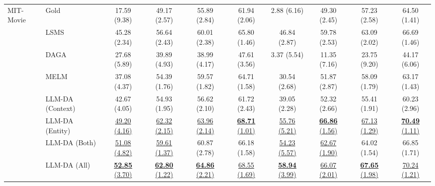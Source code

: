 \documentclass[11pt]{article}
\begin{document}
\begin{table}[!t]
{\begin{tabular}{l|l|cccc|cccc}
        \multirow{9}{*}{{MIT-Movie}} & Gold & 17.59 (9.38) & 49.17 (2.57) & 55.89 (2.84) & 61.94 (2.06) & 2.88 (6.16) & 49.30 (2.45) & 57.23 (2.58) & 64.50 (1.41) \\
        ~ & LSMS & 45.28 (2.34) & 56.64 (2.43) & 60.01 (2.38) & 65.80 (1.46) & 46.84 (2.87) & 59.78 (2.53) & 63.09 (2.02) & 66.69 (1.46) \\
        ~ & DAGA & 27.68 (5.89) & 39.89 (4.93) & 38.99 (4.17) & 47.61 (3.56) & 3.37 (5.54) & 11.35 (7.16) & 23.75 (9.20) & 44.17 (6.06) \\ 
        ~ & MELM & 37.08 (4.37) & 54.39 (1.76) & 59.57 (1.82) & 64.71 (1.58) & 30.54 (2.68) & 51.87 (2.87) & 58.09 (1.79) & 63.17 (1.43) \\
        \rowcolor{gray!10} \cellcolor{gray!0}MIT-Movie & LLM-DA (Context) & {42.67 (4.05)} & 54.93 (1.95) & 56.62 (2.10) & 61.72 (2.43) & {39.05 (2.28)} & 52.32 (2.66) & {55.41 (1.91)} & {60.23 (2.96)} \\ 
        \rowcolor{gray!10} \cellcolor{gray!0}~ & LLM-DA (Entity) & \underline{49.20 (4.16)} & \underline{62.32 (2.15)} & \underline{63.96 (2.14)} & \underline{\textbf{68.71} (1.01)} & \underline{55.76 (5.21)} & \underline{\textbf{66.86} (1.56)} & \underline{67.13 (1.29)} & \underline{\textbf{70.49} (1.11)} \\ 
        \rowcolor{gray!10} \cellcolor{gray!0}~ & LLM-DA (Both) & \underline{51.08 (4.82)} & \underline{59.61 (1.37)} & 60.87 (2.78) & 66.18 (1.58) & \underline{54.23 (5.57)} & \underline{62.67 (1.90)} & 64.02 (1.54) & 66.85 (1.71) \\ 
        \rowcolor{gray!10} \cellcolor{gray!0}~ & LLM-DA (All) & \underline{\textbf{52.85} (3.70)} & \underline{\textbf{62.80} (1.22)} & \underline{\textbf{64.86} (2.21)} & \underline{68.55 (1.69)} & \underline{\textbf{58.94} (3.99)} & \underline{66.07 (2.01)} & \underline{\textbf{67.65} (1.98)} & \underline{70.24 (1.21)} \\
        \midrule
        

\end{tabular}}
\end{table}
\end{document}
